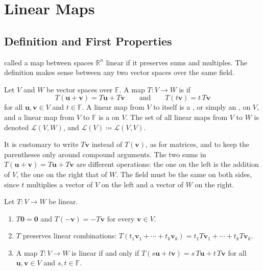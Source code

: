 \section{Linear Maps}
\label{sec:linear-maps}

\subsection{Definition and First Properties}

 called a map between spaces $\mathbb R^n$ linear if it preserves sums and multiples. The definition makes sense between any two vector spaces over the same field.

\begin{definition}
\label{def:linear-map-general}
Let $V$ and $W$ be vector spaces over $\mathbb F$. A map $T\colon V\to W$ is  if
\[
T(\mathbf u+\mathbf v)=T\mathbf u+T\mathbf v\qquad\text{and}\qquad T(t\mathbf v)=t\,T\mathbf v
\]
for all $\mathbf u,\mathbf v\in V$ and $t\in\mathbb F$. A linear map from $V$ to itself is a , or simply an , on $V$, and a linear map from $V$ to $\mathbb F$ is a  on $V$. The set of all linear maps from $V$ to $W$ is denoted $\mathcal L(V,W)$, and $\mathcal L(V)\coloneqq\mathcal L(V,V)$.
\end{definition}

It is customary to write $T\mathbf v$ instead of $T(\mathbf v)$, as for matrices, and to keep the parentheses only around compound arguments. The two sums in $T(\mathbf u+\mathbf v)=T\mathbf u+T\mathbf v$ are different operations: the one on the left is the addition of $V$, the one on the right that of $W$. The field must be the same on both sides, since $t$ multiplies a vector of $V$ on the left and a vector of $W$ on the right.

\begin{proposition}
\label{prop:linear-basic}
Let $T\colon V\to W$ be linear.
\begin{enumerate}
\item $T\mathbf 0=\mathbf 0$ and $T(-\mathbf v)=-T\mathbf v$ for every $\mathbf v\in V$.
\item $T$ preserves linear combinations: $T(t_1\mathbf v_1+\cdots+t_k\mathbf v_k)=t_1T\mathbf v_1+\cdots+t_kT\mathbf v_k$.
\item A map $T\colon V\to W$ is linear if and only if $T(s\mathbf u+t\mathbf v)=s\,T\mathbf u+t\,T\mathbf v$ for all $\mathbf u,\mathbf v\in V$ and $s,t\in\mathbb F$.
\end{enumerate}
\end{proposition}

